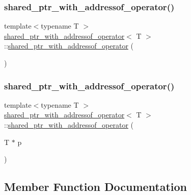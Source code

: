\subsubsection{\texorpdfstring{shared\_ptr\_with\_addressof\_operator()}{shared\_ptr\_with\_addressof\_operator()}\hspace{0.1cm}{\footnotesize\ttfamily [1/2]}}
{\footnotesize\ttfamily template$<$typename T $>$ \\
\mbox{\hyperlink{classshared__ptr__with__addressof__operator}{shared\+\_\+ptr\+\_\+with\+\_\+addressof\+\_\+operator}}$<$ T $>$\+::\mbox{\hyperlink{classshared__ptr__with__addressof__operator}{shared\+\_\+ptr\+\_\+with\+\_\+addressof\+\_\+operator}} (\begin{DoxyParamCaption}{ }\end{DoxyParamCaption})\hspace{0.3cm}{\ttfamily [default]}}

\mbox{\label{classshared__ptr__with__addressof__operator_a2f78d3343f1a00d17bb393dad8382cf6}} 
\subsubsection{\texorpdfstring{shared\_ptr\_with\_addressof\_operator()}{shared\_ptr\_with\_addressof\_operator()}\hspace{0.1cm}{\footnotesize\ttfamily [2/2]}}
{\footnotesize\ttfamily template$<$typename T $>$ \\
\mbox{\hyperlink{classshared__ptr__with__addressof__operator}{shared\+\_\+ptr\+\_\+with\+\_\+addressof\+\_\+operator}}$<$ T $>$\+::\mbox{\hyperlink{classshared__ptr__with__addressof__operator}{shared\+\_\+ptr\+\_\+with\+\_\+addressof\+\_\+operator}} (\begin{DoxyParamCaption}\item[{T $\ast$}]{p }\end{DoxyParamCaption})\hspace{0.3cm}{\ttfamily [inline]}}



\subsection{Member Function Documentation}
\mbox{\label{classshared__ptr__with__addressof__operator_a68e7386545e7d9e52af937a7451b724d}} 
